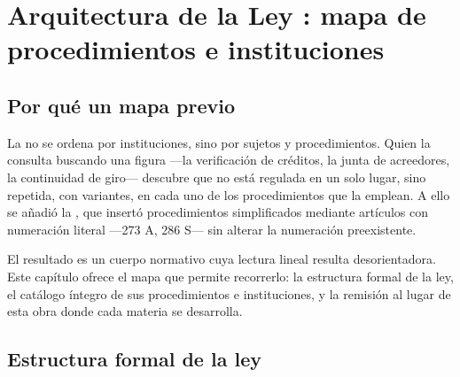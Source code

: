 \chapter{Arquitectura de la Ley : mapa de procedimientos e instituciones}
\label{cap:arquitectura}


\section{Por qué un mapa previo}

La \LIR{} \citeyearpar{ley-20720} no se ordena por instituciones, sino por sujetos y
procedimientos. Quien la consulta buscando una figura ---la verificación de créditos, la
junta de acreedores, la continuidad de giro--- descubre que no está regulada en un solo
lugar, sino repetida, con variantes, en cada uno de los procedimientos que la emplean.
A ello se añadió la \Lreforma{} \citeyearpar{ley-21563}, que insertó procedimientos
simplificados mediante artículos con numeración literal ---273 A, 286 S--- sin alterar la
numeración preexistente.

El resultado es un cuerpo normativo cuya lectura lineal resulta desorientadora. Este
capítulo ofrece el mapa que permite recorrerlo: la estructura formal de la ley, el
catálogo íntegro de sus procedimientos e instituciones, y la remisión al lugar de esta
obra donde cada materia se desarrolla.

\section{Estructura formal de la ley}

